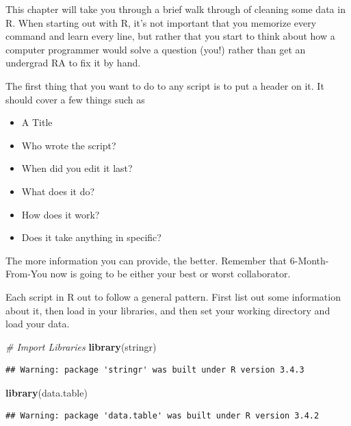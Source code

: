 \documentclass[]{book}
\newenvironment{Shaded}{\begin{snugshade}}{\end{snugshade}}
\newcommand{\KeywordTok}[1]{\textcolor[rgb]{0.13,0.29,0.53}{\textbf{#1}}}
\newcommand{\CommentTok}[1]{\textcolor[rgb]{0.56,0.35,0.01}{\textit{#1}}}
\newcommand{\NormalTok}[1]{#1}
\providecommand{\tightlist}{%
  \setlength{\itemsep}{0pt}\setlength{\parskip}{0pt}}
\theoremstyle{definition}
\theoremstyle{definition}
\theoremstyle{definition}
\theoremstyle{remark}
\begin{document}
This chapter will take you through a brief walk through of cleaning some
data in R. When starting out with R, it's not important that you
memorize every command and learn every line, but rather that you start
to think about how a computer programmer would solve a question (you!)
rather than get an undergrad RA to fix it by hand.

The first thing that you want to do to any script is to put a header on
it. It should cover a few things such as

\begin{itemize}
\tightlist
\item
  A Title
\item
  Who wrote the script?
\item
  When did you edit it last?
\item
  What does it do?
\item
  How does it work?
\item
  Does it take anything in specific?
\end{itemize}

The more information you can provide, the better. Remember that
6-Month-From-You now is going to be either your best or worst
collaborator.

Each script in R out to follow a general pattern. First list out some
information about it, then load in your libraries, and then set your
working directory and load your data.

\begin{Shaded}
\begin{Highlighting}[]
 \CommentTok{# Import Libraries }
 \KeywordTok{library}\NormalTok{(stringr)}
\end{Highlighting}
\end{Shaded}

\begin{verbatim}
## Warning: package 'stringr' was built under R version 3.4.3
\end{verbatim}

\begin{Shaded}
\begin{Highlighting}[]
 \KeywordTok{library}\NormalTok{(data.table)}
\end{Highlighting}
\end{Shaded}

\begin{verbatim}
## Warning: package 'data.table' was built under R version 3.4.2
\end{verbatim}
\end{document}
